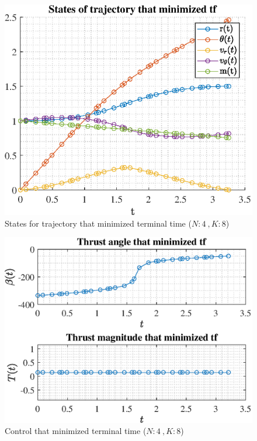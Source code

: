 \documentclass[]{article}
\begin{document}
	\begin{figure}
		\centering
		\includegraphics[scale=0.75]{states_N4_K8_C2_tf.eps}
		\caption{States for trajectory that minimized terminal time (\(N:4\ , K:8\))}
		\label{fig:states_N4_K8_C2_tf}
	\end{figure}
	\begin{figure}
		\centering
		\includegraphics[scale=0.75]{control_N4_K8_C2_tf.eps}
		\caption{Control that minimized terminal time (\(N:4\ , K:8\))}
		\label{fig:control_N4_K8_C2_tf}
	\end{figure}
\end{document}
